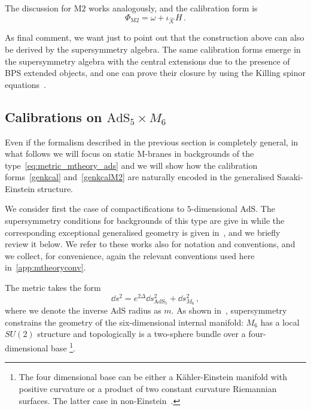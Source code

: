 \documentclass[debug]{phd}
\begin{document}
	The discussion for $\mathrm{M}2$ works analogously, and the calibration form is 
		\begin{equation}
		\label{genkcalM2}
			\Phi_{\mathrm{M}2} = \omega + \iota_{\hat{\mathcal{K}}} H\, .
		\end{equation}
	
As final comment, we want just to point out that the construction above can also be derived by the supersymmetry algebra. The same calibration forms emerge in the supersymmetry algebra with the central extensions due to the presence of BPS extended objects, and one can prove their closure by using the Killing spinor equations~\cite{HPS03,Gutowski:1999tu, Cascales:2004qp}.

%
\subsection{\texorpdfstring{Calibrations on $\mathrm{AdS}_5 \times M_6$}{Calibration on AdS5 x M6}}
%
Even if the formalism described in the previous section is completely general, in what follows we will focus on static M-branes in backgrounds of the type~\eqref{eq:metric_mtheory_ads} and we will show how the calibration forms~\eqref{genkcal} and~\eqref{genkcalM2} are naturally encoded in the generalised Sasaki-Einstein structure.

We consider first the case of compactifications to $5$-dimensional AdS. 
The supersymmetry conditions for backgrounds of this type are give in \cite{Gauntlett:2004zh} while the corresponding exceptional generalised geometry is given in~\cite{AshmoreESE,Grana_Ntokos}, and we briefly review it below. 
We refer to these works also for notation and conventions, and we collect, for convenience, again the relevant conventions used here in~\cref{app:mtheoryconv}.

The metric takes the form
\begin{equation}
\label{eq:metric_mtheory_ads5}
	\dd  s^2 = e^{2\Delta}\dd  s^2_{\mathrm{AdS}_5} + \dd  s^2_{M_6}\, ,
\end{equation}
where we denote the inverse AdS radius as $m$. As shown in~\cite{Gauntlett:2004zh}, supersymmetry constrains the geometry of the six-dimensional internal manifold: $M_6$ has a local $SU(2)$ structure and topologically is a two-sphere bundle over a four-dimensional base%
		\footnote{%
			The four dimensional base can be either a K\"ahler-Einstein manifold with positive curvature or a product of two constant curvature Riemannian surfaces. The latter case in non-Einstein~\cite{Gauntlett:2004zh}.%
			}. 
\end{document}
